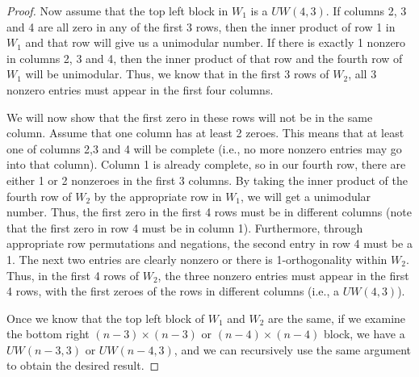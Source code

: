 \begin{lemma}
\begin{proof}

Now assume that the top left block in $W_1$ is a $UW(4,3)$. If columns 2, 3 and 4 are all zero in any of the first 3 rows, then the inner product of row 1 in $W_1$ and that row will give us a unimodular number. If there is exactly 1 nonzero in columns 2, 3 and 4, then the inner product of that row and the fourth row of $W_1$ will be unimodular. Thus, we know that in the first 3 rows of $W_2$, all 3 nonzero entries must appear in the first four columns.

We will now show that the first zero in these rows will not be in the same column. Assume that one column has at least 2 zeroes. This means that at least one of columns 2,3 and 4 will be complete (i.e., no more nonzero entries may go into that column). Column 1 is already complete, so in our fourth row, there are either 1 or 2 nonzeroes in the first 3 columns. By taking the inner product of the fourth row of $W_2$ by the appropriate row in $W_1$, we will get a unimodular number. Thus, the first zero in the first 4 rows must be in different columns (note that the first zero in row 4 must be in column 1). Furthermore, through appropriate row permutations and negations, the second entry in row 4 must be a 1. The next two entries are clearly nonzero or there is 1-orthogonality within $W_2$. Thus, in the first 4 rows of $W_2$, the three nonzero entries must appear in the first 4 rows, with the first zeroes of the rows in different columns (i.e., a $UW(4,3)$).

Once we know that the top left block of $W_1$ and $W_2$ are the same, if we examine the bottom right $(n-3) \times (n-3)$ or $(n-4) \times (n-4)$ block, we have a $UW(n-3,3)$ or $UW(n-4,3)$, and we can recursively use the same argument to obtain the desired result.
\end{proof}

\end{lemma}

